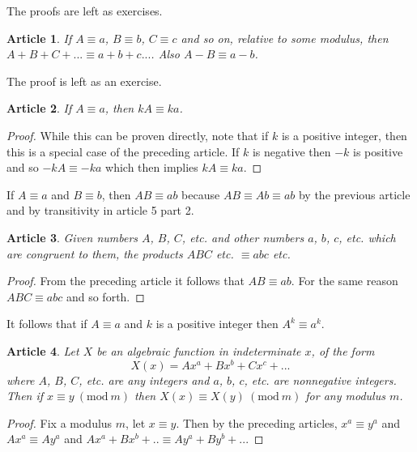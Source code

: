 \documentclass{article}
\theoremstyle{problemstyle}
\newtheorem{article}{Article}
\newcommand{\Mod}[1]{\ (\mathrm{mod}\ #1)}
\begin{document}
The proofs are left as exercises. 

\begin{article}
If $A \equiv a$, $B \equiv b$, $C \equiv c$ and so on, relative to some modulus, then $A+B+C+... \equiv a+b+c...$. Also $A-B \equiv a-b$.
\end{article}

The proof is left as an exercise. 

\begin{article}
If $A \equiv a$, then $kA \equiv ka$. 
\end{article}

\begin{proof}
While this can be proven directly, note that if $k$ is a positive integer, then this is a special case of the preceding article. If $k$ is negative then $-k$ is positive and so $-kA \equiv -ka$ which then implies $kA \equiv ka$. 
\end{proof}

If $A \equiv a$ and $B \equiv b$, then $AB \equiv ab$ because $AB \equiv Ab \equiv ab$ by the previous article and by transitivity in article 5 part 2. 

\begin{article}
Given numbers $A$, $B$, $C$, etc. and other numbers $a$, $b$, $c$, etc. which are congruent to them, the products $ABC$ etc. $\equiv abc$ etc. 
\end{article}

\begin{proof}
From the preceding article it follows that $AB \equiv ab$. For the same reason $ABC \equiv abc$ and so forth. 
\end{proof}

It follows that if $A \equiv a$ and $k$ is a positive integer then $A^k \equiv a^k$. 

\begin{article}
Let $X$ be an algebraic function in indeterminate $x$, of the form $$X(x) = Ax^a+Bx^b+Cx^c+...$$ where $A$, $B$, $C$, etc. are any integers and $a$, $b$, $c$, etc. are nonnegative integers. Then if $x \equiv y \Mod{m}$ then $X(x) \equiv X(y)\Mod{m}$ for any modulus $m$. 
\end{article}

\begin{proof}
Fix a modulus $m$, let $x \equiv y$. Then by the preceding articles, $x^a \equiv y^a$ and $Ax^a \equiv Ay^a$ and $Ax^a +Bx^b +.. \equiv Ay^a+By^b+...$
\end{proof}
\end{document}
